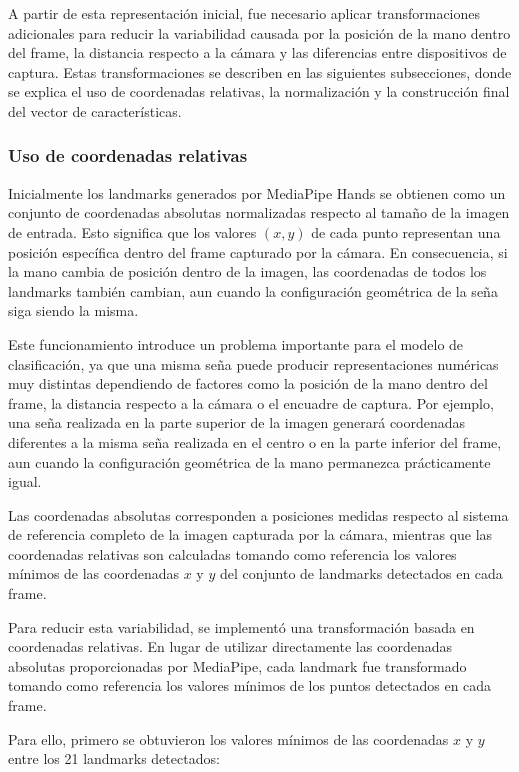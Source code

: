 	A partir de esta representación inicial, fue necesario aplicar transformaciones
	adicionales para reducir la variabilidad causada por la posición de la mano dentro
	del frame, la distancia respecto a la cámara y las diferencias entre dispositivos
	de captura. Estas transformaciones se describen en las siguientes subsecciones,
	donde se explica el uso de coordenadas relativas, la normalización y la
	construcción final del vector de características.
	
	\subsubsection{Uso de coordenadas relativas}
	
	Inicialmente los landmarks generados por MediaPipe Hands se obtienen como un
	conjunto de coordenadas absolutas normalizadas respecto al tamaño de la imagen de
	entrada. Esto significa que los valores $(x,y)$ de cada punto representan una
	posición específica dentro del frame capturado por la cámara. En consecuencia, si
	la mano cambia de posición dentro de la imagen, las coordenadas de todos los
	landmarks también cambian, aun cuando la configuración geométrica de la seña siga
	siendo la misma.
	
	Este funcionamiento introduce un problema importante para el modelo de
	clasificación, ya que una misma seña puede producir representaciones numéricas muy
	distintas dependiendo de factores como la posición de la mano dentro del frame, la
	distancia respecto a la cámara o el encuadre de captura. Por ejemplo, una seña
	realizada en la parte superior de la imagen generará coordenadas diferentes a la
	misma seña realizada en el centro o en la parte inferior del frame, aun cuando la
	configuración geométrica de la mano permanezca prácticamente igual.
	
	Las coordenadas absolutas corresponden a posiciones medidas
	respecto al sistema de referencia completo de la imagen capturada por la cámara,
	mientras que las coordenadas relativas son calculadas tomando como referencia los
	valores mínimos de las coordenadas $x$ y $y$ del conjunto de landmarks detectados
	en cada frame.
	
	Para reducir esta variabilidad, se implementó una transformación
	basada en coordenadas relativas. En lugar de utilizar directamente las coordenadas
	absolutas proporcionadas por MediaPipe, cada landmark fue transformado tomando
	como referencia los valores mínimos de los puntos detectados en cada frame.
	
	Para ello, primero se obtuvieron los valores mínimos de las coordenadas $x$ y
	$y$ entre los 21 landmarks detectados:
	
